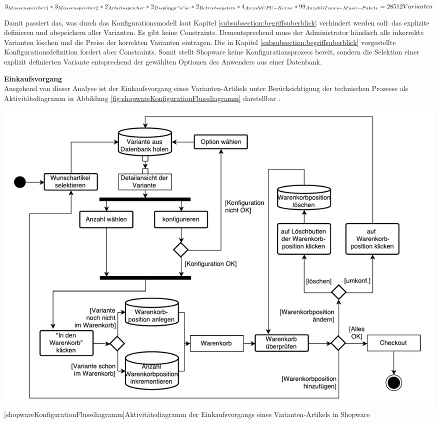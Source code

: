 \documentclass[12pt,a4paper,bibliography=totocnumbered,listof=totoc]{scrartcl}
\begin{document}
$3_{Massenspeicher1}*3_{Massenspeicher2}*2_{Arbeitsspeicher}*2_{Displaygr"o"se}*2_{Betriebssystem}*4_{Anzahl CPU-Kerne}*99_{Anzahl iTunes-Music-Pakete} = 28512  Varianten$

Damit passiert das, was durch das Konfigurationsmodell laut Kapitel \ref{subsubsection:begriffsuberblick} verhindert werden soll: das explizite definieren und abspeichern aller Varianten. Es gibt keine Constraints. Dementsprechend muss der Administrator händisch alle inkorrekte Varianten löschen und die Preise der korrekten Varianten eintragen. Die in Kapitel \ref{subsubsection:begriffsuberblick} vorgestellte Konfigurationsdefinition \citet{sabin98} fordert aber Constraints. Somit stellt Shopware keine Konfigurationsprozess bereit, sondern die Selektion einer explizit definierten Variante entsprechend der gewählten Optionen des Anwenders aus einer Datenbank.

\textbf{Einkaufsvorgang}\\
Ausgehend von dieser Analyse ist der Einkaufsvorgang eines Varianten-Artikels unter Berücksichtigung der technischen Prozesse als Aktivitätsdiagramm in Abbildung \ref{fig:shopwareKonfigurationFlussdiagramm} darstellbar .

\vspace{1em}
\begin{minipage}{\linewidth}
	\centering
	\includegraphics[width=1\linewidth]{Abbildungen/shopwareKonfigurationFlussdiagramm.pdf}
	[shopwareKonfigurationFlussdiagramm]{Aktivitätsdiagramm der Einkaufsvorgangs eines Varianten-Artikels in Shopware}
	\label{fig:shopwareKonfigurationFlussdiagramm}
\end{minipage}
\vspace{1em}
\end{document}
